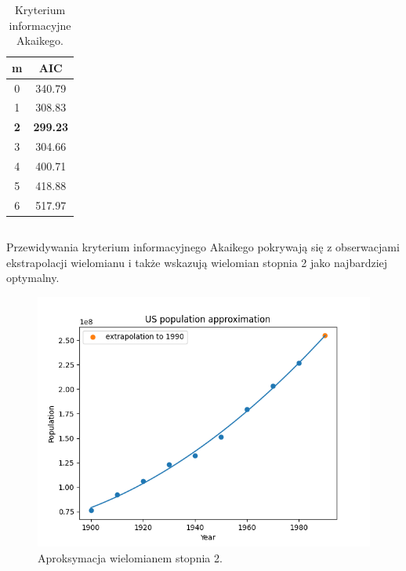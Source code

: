 \documentclass[11pt]{scrartcl}
\begin{document}
    \begin{table}[H]
        \centering
        \renewcommand{\arraystretch}{1.5}
        \begin{tabular}{|c|c|}
            \hline
            \textbf{m} & \textbf{AIC} \\
            \hline
            0 & 340.79 \\
            \hline
            1 & 308.83 \\
            \hline
            \textbf{2} & \textbf{299.23} \\
            \hline
            3 & 304.66 \\
            \hline
            4 & 400.71 \\
            \hline
            5 & 418.88 \\
            \hline
            6 & 517.97 \\
            \hline
        \end{tabular}
        \caption{Kryterium informacyjne Akaikego.}
    \end{table}
    
    \subsection*{}
    Przewidywania kryterium informacyjnego Akaikego pokrywają się
    z obserwacjami ekstrapolacji wielomianu i także wskazują wielomian
    stopnia 2 jako najbardziej optymalny.

    \begin{figure}[H]
        \centering
        \includegraphics[width=0.8\linewidth]{approx1.png}
        \caption{Aproksymacja wielomianem stopnia 2.}
    \end{figure}
\end{document}
